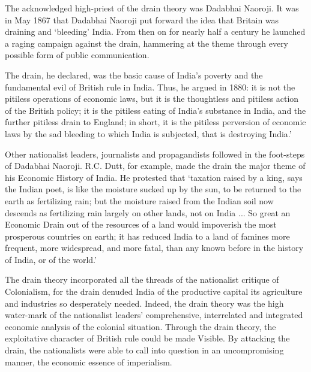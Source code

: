 \begin{multicols}{2}
The acknowledged high-priest of the drain theory was Dadabhai Naoroji. It was in May 1867 that Dadabhai Naoroji put forward the idea that Britain was draining and `bleeding' India. From then on for nearly half a century he launched a raging campaign against the drain, hammering at the theme through every possible form of public communication.

The drain, he declared, was the basic cause of India's poverty and the fundamental evil of British rule in India. Thus, he argued in 1880: it is not the pitiless operations of economic laws, but it is the thoughtless and pitiless action of the British policy; it is the pitiless eating of India's substance in India, and the further pitiless drain to England; in short, it is the pitiless perversion of economic laws by the sad bleeding to which India is subjected, that is destroying India.'

Other nationalist leaders, journalists and propagandists followed in the foot-steps of Dadabhai Naoroji. R.C. Dutt, for example, made the drain the major theme of his Economic History of India. He protested that `taxation raised by a king, says the Indian poet, is like the moisture sucked up by the sun, to be returned to the earth as fertilizing rain; but the moisture raised from the Indian soil now descends as fertilizing rain largely on other lands, not on India ... So great an Economic Drain out of the resources of a land would impoverish the most prosperous countries on earth; it has reduced India to a land of famines more frequent, more widespread, and more fatal, than any known before in the history of India, or of the world.'

The drain theory incorporated all the threads of the nationalist critique of Colonialism, for the drain denuded India of the productive capital its agriculture and industries so desperately needed. Indeed, the drain theory was the high water-mark of the nationalist leaders' comprehensive, interrelated and integrated economic analysis of the colonial situation. Through the drain theory, the exploitative character of British rule could be made Visible. By attacking the drain, the nationalists were able to call into question in an uncompromising manner, the economic essence of imperialism.


\end{multicols}
